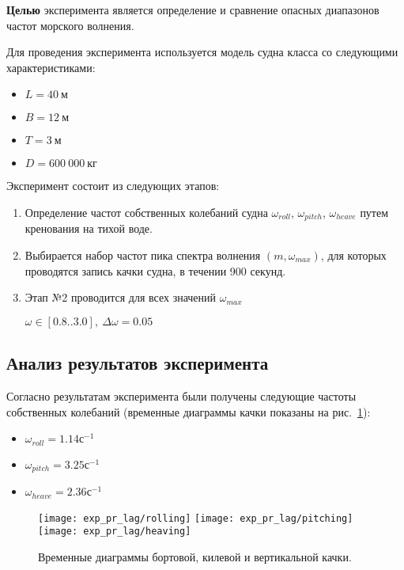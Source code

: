 \textbf{Целью} эксперимента является определение и сравнение опасных диапазонов частот морского волнения.

Для проведения эксперимента используется модель судна класса  со следующими характеристиками:
\begin{itemize}
	\item	$L = 40\ \text{м}$
	\item	$B = 12\ \text{м}$
	\item	$T = 3\ \text{м}$
	\item	$D = 600\ 000\ \text{кг}$
\end{itemize}

Эксперимент состоит из следующих этапов:
\begin{enumerate}
	\item	Определение частот собственных колебаний судна 
			$\omega_{roll}$, $\omega_{pitch}$, $\omega_{heave}$ путем кренования на тихой воде.
	\item	Выбирается набор частот пика спектра волнения $(m, \omega_{max})$, для которых
			проводятся запись качки судна, в течении 900 секунд.
	\item	Этап №2	проводится для всех значений $\omega_{max}$
			
			$\omega \in [0.8..3.0],\ \Delta\omega=0.05$ 

\end{enumerate}

\subsection{Анализ результатов эксперимента}

Согласно результатам эксперимента были получены следующие частоты собственных колебаний (временные диаграммы качки показаны на рис.~\ref{exp_pr_rolling_lag}):
\begin{itemize}
	\item	$ \omega_{roll} = 1.14 \text{с}^{-1}$
	\item	$ \omega_{pitch} = 3.25 \text{с}^{-1}$
	\item	$ \omega_{heave} = 2.36 \text{с}^{-1}$
\end{itemize}

\begin{figure}[ht]
	\begin{center}
	\texttt{[image: exp\_pr\_lag/rolling]}
	\texttt{[image: exp\_pr\_lag/pitching]}
	\texttt{[image: exp\_pr\_lag/heaving]}
	\end{center}
	\caption{Временные диаграммы бортовой, килевой и вертикальной качки.}
	\label{exp_pr_rolling_lag}
\end{figure}

